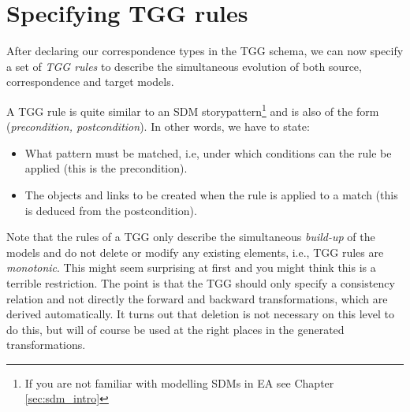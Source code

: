 \section{Specifying TGG rules}

After declaring our correspondence types in the TGG schema, we can now specify a set of \emph{TGG rules} to describe the simultaneous evolution of both source, correspondence and target models.

A TGG rule is quite similar to an SDM storypattern\footnote{If you are not familiar with modelling SDMs in EA see Chapter \ref{sec:sdm_intro}} and is also of the form (\emph{precondition, postcondition}).
In other words, we have to state:
\begin{itemize}
  \item What pattern must be matched, i.e, under which conditions can the rule be applied (this is the precondition).
  \item The objects and links to be created when the rule is applied to a match (this is deduced from the postcondition). 
\end{itemize}

Note that the rules of a TGG only describe the simultaneous \emph{build-up} of the models and do not delete or modify any existing elements, i.e., TGG rules are \emph{monotonic}.
This might seem surprising at first and you might think this is a terrible restriction.
The point is that the TGG should only specify a consistency relation and not directly the forward and backward transformations, which are derived automatically. 
It turns out that deletion is not necessary on this level to do this, but will of course be used at the right places in the generated transformations. 

